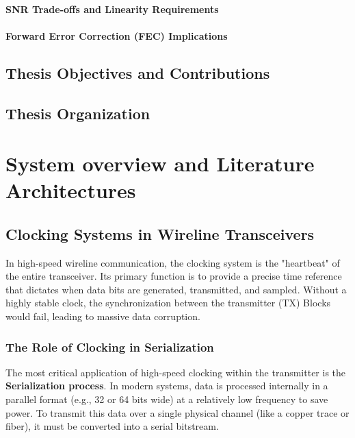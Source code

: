 \documentclass[12pt, a4paper]{report}
\begin{document}
        \subsubsection{SNR Trade-offs and Linearity Requirements}
        \subsubsection{Forward Error Correction (FEC) Implications}

\section{Thesis Objectives and Contributions}
\section{Thesis Organization}

\chapter{System overview and Literature Architectures}
\label{ch:fundamentals}

\section{Clocking Systems in Wireline Transceivers}
\label{sec:clocking-systems}

In high-speed wireline communication, the clocking system is the "heartbeat" of the entire transceiver. Its primary function is to provide a precise time reference that dictates when data bits are generated, transmitted, and sampled. Without a highly stable clock, the synchronization between the transmitter (TX) Blocks would fail, leading to massive data corruption.

\subsection{The Role of Clocking in Serialization}
\label{subsec:role-clocking-serialization}

The most critical application of high-speed clocking within the transmitter is the \textbf{Serialization process}. In modern systems, data is processed internally in a parallel format (e.g., 32 or 64 bits wide) at a relatively low frequency to save power. To transmit this data over a single physical channel (like a copper trace or fiber), it must be converted into a serial bitstream.
\end{document}

